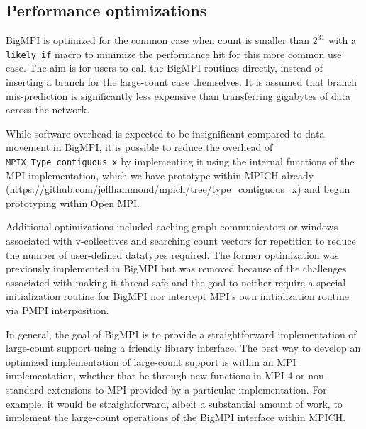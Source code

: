 \subsection{Performance optimizations}

BigMPI is optimized for the common case when count is smaller than $2^{31}$
with a \texttt{likely\_if} macro to minimize the performance hit for
this more common use case.  The aim is for users to call the BigMPI routines
directly, instead of inserting a branch for the large-count case themselves.
It is assumed that branch mis-prediction is significantly less expensive than
transferring gigabytes of data across the network.

While software overhead is expected to be insignificant compared to data movement
in BigMPI, it is possible to reduce the overhead of \texttt{MPIX\_Type\_contiguous\_x}
by implementing it using the internal functions of the MPI implementation,
which we have prototype within MPICH already 
(\href{https://github.com/jeffhammond/mpich/tree/type_contiguous_x}
{https://github.com/jeffhammond/mpich/tree/type\_contiguous\_x})
and begun prototyping within Open MPI.

Additional optimizations included caching graph communicators or windows associated
with v-collectives and searching count vectors for repetition to reduce the number of 
user-defined datatypes required.
The former optimization was previously implemented
in BigMPI but was removed because of the challenges associated with making it 
thread-safe and the goal to neither require a special initialization routine for BigMPI
nor intercept MPI's own initialization routine via PMPI interposition.

In general, the goal of BigMPI is to provide a straightforward implementation of
large-count support using a friendly library interface.
The best way to develop an optimized implementation of large-count support
is within an MPI implementation, whether that be through new functions in MPI-4
or non-standard extensions to MPI provided by a particular implementation.
For example, it would be straightforward, albeit a substantial amount of work,
to implement the large-count operations of the BigMPI interface within MPICH.



